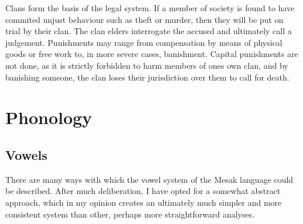 \documentclass[paper=6in:9in, fontsize=10.5]{scrbook}
\newcommand{\ý}{ɨ́}
\begin{document}
Clans form the basis of the legal system. If a member of society is found to have commited unjust behaviour such as theft or murder, then they will be put on trial by their clan. The clan elders interrogate the accused and ultimately call a judgement. Punishments may range from compensation by means of physical goods or free work to, in more severe cases, banishment. Capital punishments are not done, as it is strictly forbidden to harm members of ones own clan, and by banishing someone, the clan loses their jurisdiction over them to call for death.

\chapter{Phonology}
\section{Vowels} \label{sec:vowel}
There are many ways with which the vowel system of the Mesak language could be described. After much deliberation, I have opted for a somewhat abstract approach, which in my opinion creates an ultimately much simpler and more consistent system than other, perhaps more straightforward analyses. 
\end{document}
